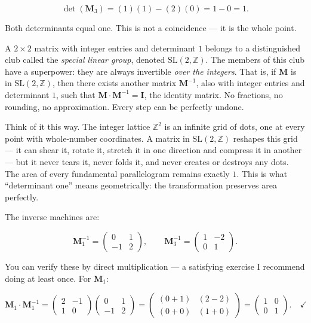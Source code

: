 \[
\det(\mathbf{M}_3) = (1)(1) - (2)(0) = 1 - 0 = 1.
\]

Both determinants equal one. This is not a coincidence --- it is the whole point.

A \(2 \times 2\) matrix with integer entries and determinant \(1\) belongs to a distinguished club called the \emph{special linear group}, denoted \(\mathrm{SL}(2, \mathbb{Z})\). The members of this club have a superpower: they are always invertible \emph{over the integers}. That is, if \(\mathbf{M}\) is in \(\mathrm{SL}(2, \mathbb{Z})\), then there exists another matrix \(\mathbf{M}^{-1}\), also with integer entries and determinant \(1\), such that \(\mathbf{M} \cdot \mathbf{M}^{-1} = \mathbf{I}\), the identity matrix. No fractions, no rounding, no approximation. Every step can be perfectly undone.

Think of it this way. The integer lattice \(\mathbb{Z}^2\) is an infinite grid of dots, one at every point with whole-number coordinates. A matrix in \(\mathrm{SL}(2, \mathbb{Z})\) reshapes this grid --- it can shear it, rotate it, stretch it in one direction and compress it in another --- but it never tears it, never folds it, and never creates or destroys any dots. The area of every fundamental parallelogram remains exactly \(1\). This is what ``determinant one'' means geometrically: the transformation preserves area perfectly.

The inverse machines are:

\[
\mathbf{M}_1^{-1} = \begin{pmatrix} 0 & 1 \\ -1 & 2 \end{pmatrix}, \qquad
\mathbf{M}_3^{-1} = \begin{pmatrix} 1 & -2 \\ 0 & 1 \end{pmatrix}.
\]

You can verify these by direct multiplication --- a satisfying exercise I recommend doing at least once. For \(\mathbf{M}_1\):

\[
\mathbf{M}_1 \cdot \mathbf{M}_1^{-1} = \begin{pmatrix} 2 & -1 \\ 1 & 0 \end{pmatrix} \begin{pmatrix} 0 & 1 \\ -1 & 2 \end{pmatrix} = \begin{pmatrix} (0+1) & (2-2) \\ (0+0) & (1+0) \end{pmatrix} = \begin{pmatrix} 1 & 0 \\ 0 & 1 \end{pmatrix}. \quad \checkmark
\]


